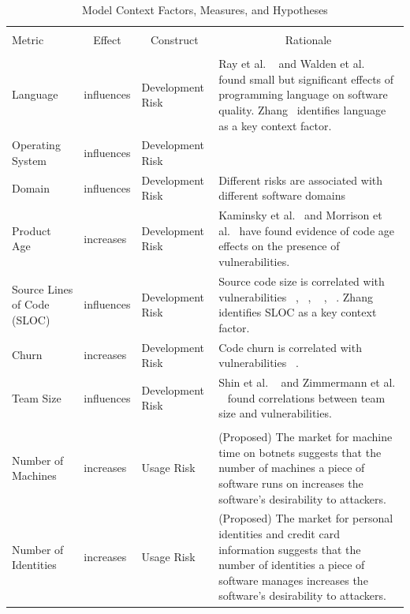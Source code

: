 \begin{table}[!htbp] \centering 
	\caption{Model Context Factors, Measures, and Hypotheses} 
	\label{tab:model_spef_metrics} 
	\begin{scriptsize}
		\begin{tabular}{p{1.75cm}p{1cm}p{1cm}p{6cm}} 
			\\[-1.8ex]\hline 
		\hline \\[-1.8ex] 
		Metric & \multicolumn{1}{c}{Effect} & \multicolumn{1}{c}{Construct} & \multicolumn{1}{c}{Rationale} \\ 
		\hline \\[-1.8ex]  
			Language	& influences &	Development Risk &   Ray et al. ~\cite{ray2014a} and Walden et al. ~\cite{walden2010idea} found small but significant effects of programming language on software quality. Zhang~\cite{zhang2014towards} identifies language as a key context factor. \\
			Operating System	& influences &	Development Risk & \\	
			Domain &	influences &	Development Risk	 & Different risks are associated with different software domains~\cite{williams2004xpef,jones2000software} \\
			Product Age	& increases &	Development Risk & Kaminsky et al.~\cite{kaminsky2011showing} and Morrison et al.~\cite{morrison2015challenges} have found evidence of code age effects on the presence of vulnerabilities. \\
			Source Lines of Code (SLOC)	& influences	& Development Risk & Source code size is correlated with vulnerabilities ~\cite{shin2011evaluating}, ~\cite{alhazmi2007measuring}, ~\cite{camilo2015do} , ~\cite{dashevskyi2016on}. Zhang~\cite{zhang2014towards} identifies SLOC as a key context factor. \\
			Churn &	increases &	Development Risk  &  Code churn is correlated with vulnerabilities ~\cite{shin2011evaluating}.\\
			Team Size	& influences	& Development Risk & Shin et al. ~\cite{shin2011evaluating} and Zimmermann et al. ~\cite{zimmerman2010searching} found correlations between team size and vulnerabilities. \\			
			\hline \\[-1.8ex] 
			Number of Machines &	increases &	Usage Risk & (Proposed) The market for machine time on botnets suggests that the number of machines a piece of software runs on increases the software's desirability to attackers. \\
			Number of Identities &	increases &	Usage Risk	 &  (Proposed) The market for personal identities and credit card information suggests that the number of identities a piece of software manages increases the software's desirability to attackers.\\

\end{tabular}
\end{scriptsize}
\end{table}

